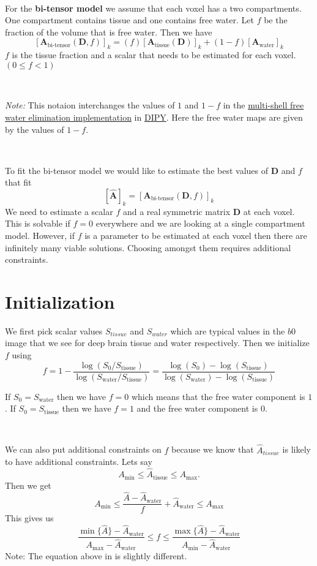 \documentclass[12pt]{article}
\newcommand{\vect}[1]{\mathbf{#1}}
\newcommand{\Amin}{A_{\text{min}}}
\newcommand{\Amax}{A_{\text{max}}}
\newcommand{\Atissue}{\vect{A}_{\text{tissue}}}
\newcommand{\Stissue}{S_{\text{tissue}}}
\newcommand{\Awater}{\vect{A}_{\text{water}}}
\newcommand{\Swater}{S_{\text{water}}}
\newcommand{\Abitensor}{\vect{A}_{\text{bi-tensor}}}
\newcommand{\Ahattissue}{\hat{A}_{\text{tissue}}}
\newcommand{\Ahatwater}{\hat{A}_{\text{water}}}
\newcommand{\vD}{\vect{D}}
\begin{document}
\ 

\noindent
For the \textbf{bi-tensor model} we assume that each voxel has a two
compartments. One compartment contains tissue and one contains free water. Let
$f$ be the fraction of the volume that is free water. Then we have 
$$[\Abitensor(\vD,f)]_k = 
  (f)[\Atissue(\vD)]_k +
  (1-f) [\Awater]_k$$
$f$ is the tissue fraction and a scalar that needs to be estimated for each
voxel. $(0 \leq f < 1)$

\ 

\noindent
\textit{Note:} This notaion interchanges the values of $1$ and $1-f$ in the
\href{http://nipy.org/dipy/examples\_built/reconst\_fwdti.html}{multi-shell
free water elimination implementation} in \href{http://nipy.org/dipy}{DIPY}.
Here the free water maps are given by the values of $1-f$. 

\ 

\noindent
To fit the bi-tensor model we would like to estimate the best values of
$\vect{D}$ and $f$ that fit $$ [\hat{\vect{A}}]_k =
[\vect{A}_{\text{bi-tensor}}(\vect{D}, f)]_k$$ We need to estimate a scalar
$f$ and a real symmetric matrix $\vect{D}$ at each voxel. This is solvable if
$f=0$ everywhere and we are looking at a single compartment model. However, if
$f$ is a parameter to be estimated at each voxel then there are infinitely many
viable solutions. Choosing amongst them requires additional constraints. 

\section{Initialization}
We first pick scalar values $S_{tissue}$ and $S_{water}$ which are typical
values in the $b0$ image that we see for deep brain tissue and water
respectively. Then we initialize $f$ using
$$f = 1 - \frac{\log(S_0 / \Stissue)}{\log(\Swater / \Stissue)} = 
\frac{\log(S_0) - \log(\Stissue)}{\log(\Swater) - \log(\Stissue)}$$

\noindent
If $S_0 = \Swater$ then we have $f = 0$ which means that the free water
component is $1$. If $S_0 = \Stissue$ then we have $f = 1$ and the free water
component is $0$. 

\ 

\noindent
We can also put additional constraints on $f$ because we know that 
$\hat{A}_{tissue}$ is likely to have additional constraints. Lets say
$$ \Amin \leq \Ahattissue \leq \Amax.$$ Then we get
$$ \Amin \leq \frac{\hat{A} - \Ahatwater}{f} + \Ahatwater \leq \Amax$$
This gives us 
$$\frac{\min{\{\hat{A}\}}-\Ahatwater}{\Amax - \Ahatwater} \leq f \leq
\frac{\max{\{\hat{A}}\}-\Ahatwater}{\Amin - \Ahatwater}$$
Note: The equation above in \cite{Pasternak2009} is slightly different.
\end{document}
